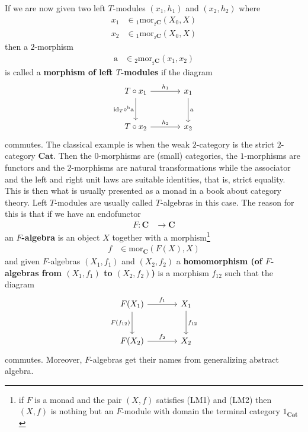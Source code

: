 If we are now given two left $T$-modules $(x_{1},h_{1})$ and $(x_{2},h_{2})$ where
\begin{align*}
  x_{1}
  &\in
  {}_{1}\mathrm{mor}_{{}_{2}\mathbf{C}}(X_{0},X)
  \\
  x_{2}
  &\in
  {}_{1}\mathrm{mor}_{{}_{2}\mathbf{C}}(X_{0},X)
\end{align*}
then a $2$-morphism
\begin{align*}
  \mathrm{a}
  &\in
  {}_{2}\mathrm{mor}_{{}_{2}\mathbf{C}}(x_{1},x_{2})
\end{align*}
is called a \textbf{morphism of left $T$-modules} if the diagram
\[
\begin{tikzcd}[sep=large]
  T
  \circ
  x_{1}
  \arrow{r}{h_{1}}
  \arrow[swap]{d}{\mathrm{id}_{T} \circ^{\textrm{h}} \mathrm{a}}
  &
  x_{1}
  \arrow{d}{\mathrm{a}}
  \\
  T
  \circ
  x_{2}
  \arrow{r}{h_{2}}
  &
  x_{2}
\end{tikzcd}
\]
commutes.
The classical example is when the weak $2$-category is the strict $2$-category $\mathbf{Cat}$.
Then the $0$-morphisms are (small) categories, the $1$-morphisms are functors and the $2$-morphisms are natural transformations while the associator and the left and right unit laws are suitable identities, that is, strict equality.
This is then what is usually presented as a monad in a book about category theory.
Left $T$-modules are usually called $T$-algebras in this case.
The reason for this is that if we have an endofunctor
\begin{align*}
  F
  \colon
  \mathbf{C}
  &\rightarrow
  \mathbf{C}
\end{align*}
an \textbf{$F$-algebra} is an object $X$ together with a morphism\footnote{if $F$ is a monad and the pair $(X,f)$ satisfies (LM1) and (LM2) then $(X,f)$ is nothing but an $F$-module with domain the terminal category $1_{\mathbf{Cat}}$}
\begin{align*}
  f
  &\in
  \mathrm{mor}_{\mathbf{C}}(F(X),X)
\end{align*}
and given $F$-algebras $(X_{1},f_{1})$ and $(X_{2},f_{2})$ a \textbf{homomorphism (of $F$-algebras from $(X_{1},f_{1})$ to $(X_{2},f_{2})$)} is a morphism $f_{12}$ such that the diagram
\[
\begin{tikzcd}[sep=large]
  F(X_{1})
  \arrow{r}{f_{1}}
  \arrow[swap]{d}{F(f_{12})}
  &
  X_{1}
  \arrow{d}{f_{12}}
  \\
  F(X_{2})
  \arrow{r}{f_{2}}
  &
  X_{2}
\end{tikzcd}
\]
commutes.
Moreover, $F$-algebras get their names from generalizing abstract algebra.
